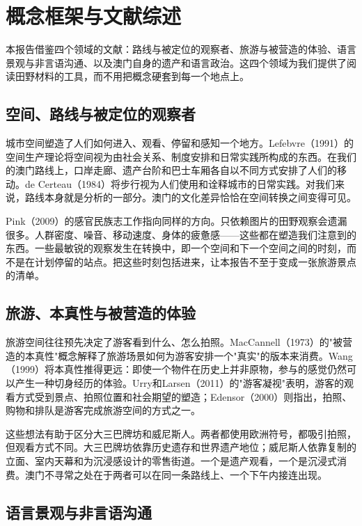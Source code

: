 \documentclass[12pt,a4paper]{article}
\begin{document}
\section{概念框架与文献综述}

本报告借鉴四个领域的文献：路线与被定位的观察者、旅游与被营造的体验、语言景观与非言语沟通、以及澳门自身的遗产和语言政治。这四个领域为我们提供了阅读田野材料的工具，而不用把概念硬套到每一个地点上。

\subsection{空间、路线与被定位的观察者}

城市空间塑造了人们如何进入、观看、停留和感知一个地方。Lefebvre（1991）的空间生产理论将空间视为由社会关系、制度安排和日常实践所构成的东西。在我们的澳门路线上，口岸走廊、遗产台阶和巴士车厢各自以不同方式安排了人们的移动。de Certeau（1984）将步行视为人们使用和诠释城市的日常实践。对我们来说，路线本身就是分析的一部分。澳门的文化差异恰恰在空间转换之间变得可见。

Pink（2009）的感官民族志工作指向同样的方向。只依赖图片的田野观察会遗漏很多。人群密度、噪音、移动速度、身体的疲惫感——这些都在塑造我们注意到的东西。一些最敏锐的观察发生在转换中，即一个空间和下一个空间之间的时刻，而不是在计划停留的站点。把这些时刻包括进来，让本报告不至于变成一张旅游景点的清单。

\subsection{旅游、本真性与被营造的体验}

旅游空间往往预先决定了游客看到什么、怎么拍照。MacCannell（1973）的"被营造的本真性"概念解释了旅游场景如何为游客安排一个"真实"的版本来消费。Wang（1999）将本真性推得更远：即使一个物件在历史上并非原物，参与的感觉仍然可以产生一种切身经历的体验。Urry和Larsen（2011）的"游客凝视"表明，游客的观看方式受到景点、拍照位置和社会期望的塑造；Edensor（2000）则指出，拍照、购物和排队是游客完成旅游空间的方式之一。

这些想法有助于区分大三巴牌坊和威尼斯人。两者都使用欧洲符号，都吸引拍照，但观看方式不同。大三巴牌坊依靠历史遗存和世界遗产地位；威尼斯人依靠复制的立面、室内天幕和为沉浸感设计的零售街道。一个是遗产观看，一个是沉浸式消费。澳门不寻常之处在于两者可以在同一条路线上、一个下午内接连出现。

\subsection{语言景观与非言语沟通}
\end{document}
